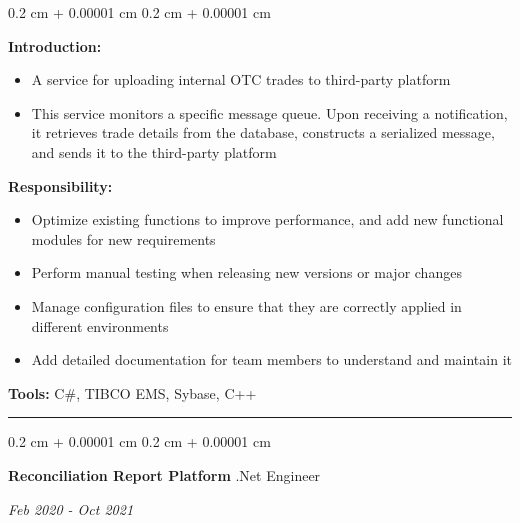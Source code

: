 \documentclass[10pt, letterpaper]{article}
\newenvironment{highlights}{
	\begin{itemize}[
		topsep=0.10 cm,
		parsep=0.10 cm,
		partopsep=0pt,
		itemsep=0pt,
		leftmargin=0.4 cm + 10pt
		]
	}{
	\end{itemize}
} %
\newenvironment{onecolentry}{
	\begin{adjustwidth}{
			0.2 cm + 0.00001 cm
		}{
			0.2 cm + 0.00001 cm
		}
	}{
	\end{adjustwidth}
} %
\newenvironment{twocolentry}[2][]{
	\onecolentry
	\def\secondColumn{#2}
	\setcolumnwidth{\fill, 4.5 cm}
	\begin{paracol}{2}
	}{
		\switchcolumn \raggedleft \secondColumn
	\end{paracol}
	\endonecolentry
} %
\begin{document}
			\vspace{0.10 cm}
			\begin{onecolentry}
				\textbf{Introduction:} 
				\begin{highlights}
					\item A service for uploading internal OTC trades to third-party platform
					\item This service monitors a specific message queue. Upon receiving a notification, it retrieves trade details from the database, constructs a serialized message, and sends it to the third-party platform
				\end{highlights}
				\textbf{Responsibility:} 
				\begin{highlights}
					\item Optimize existing functions to improve performance, and add new functional modules for new requirements
					\item Perform manual testing when releasing new versions or major changes
					\item Manage configuration files to ensure that they are correctly applied in different environments
					\item Add detailed documentation for team members to understand and maintain it
				\end{highlights}
				\textbf{Tools:} C\#, TIBCO EMS, Sybase, C++
			\end{onecolentry}
			\vspace{0.4 cm}
			\hrule
			\vspace{0.4 cm}
			
			\begin{twocolentry}{	
				\textit{Feb 2020 - Oct 2021}}
				\textbf{Reconciliation Report Platform}
				\space\space\space\space\space\space\space\space\space\space\space\space .Net Engineer
			\end{twocolentry}
			
\end{document}
